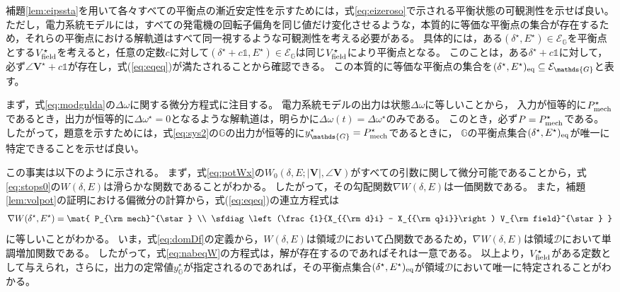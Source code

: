 \documentclass[tombow,dvipdfmx]{corona-a5}
\begin{document}
\begin{証明}
補題\ref{lem:eipssta}を用いて各々すべての平衡点の漸近安定性を示すためには，式\ref{eq:eizeroso}で示される平衡状態の可観測性を示せば良い。
ただし，電力系統モデルには，すべての発電機の回転子偏角を同じ値だけ変化させるような，本質的に等価な平衡点の集合が存在するため，それらの平衡点における解軌道はすべて同一視するような可観測性を考える必要がある。
具体的には，ある$(\delta^{\star},E^{\star}) \in \mathcal{E}_{\mathds{G}}$を平衡点とする$V_{\rm field}^{\star}$を考えると，任意の定数$c$に対して$(\delta^{\star}+c \mathds{1},E^{\star}) \in \mathcal{E}_{\mathds{G}}$は同じ$V_{\rm field}^{\star}$により平衡点となる。
このことは，ある$\delta^{\star}+c \mathds{1}$に対して，必ず$\angle \bm{V}^{\star}+c \mathds{1}$が存在し，式(\ref{eq:eqeq})が満たされることから確認できる。
この本質的に等価な平衡点の集合を$(\delta^{\star} ,E^{\star})_{\rm eq} \subseteq \mathcal{E}_{\mathds{G}}$と表す。

まず，式\ref{eq:modgnlda}の$\Delta \omega$に関する微分方程式に注目する。
電力系統モデルの出力は状態$\Delta \omega$に等しいことから，
入力が恒等的に$P_{\rm mech}^{\star}$であるとき，出力が恒等的に$\Delta \omega^{\star}=0$となるような解軌道は，明らかに$\Delta \omega(t) = \Delta \omega^{\star}$のみである。
このとき，必ず$P = P_{\rm mech}^{\star}$である。
したがって，題意を示すためには，式\ref{eq:sys2}の$\mathds{G}$の出力が恒等的に$y_{\mathds{G}}^{\star} = P_{\rm mech}^{\star}$であるときに，
$\mathds{G}$の平衡点集合$(\delta^{\star} ,E^{\star})_{\rm eq}$が唯一に特定できることを示せば良い。

この事実は以下のように示される。
まず，式\ref{eq:potWx}の$W_0(\delta, E; |\bm{V}|, \angle \bm{V})$がすべての引数に関して微分可能であることから，式\ref{eq:stops0}の$W(\delta,E)$は滑らかな関数であることがわかる。
したがって，その勾配関数$\nabla W(\delta,E)$は一価関数である。
また，補題\ref{lem:volpot}の証明における偏微分の計算から，式(\ref{eq:eqeq})の連立方程式は
\begin{align}\label{eq:nabeqW}
\nabla W(\delta^{\star},E^{\star})
=
\mat{
P_{\rm mech}^{\star} \\
\sfdiag\left(\frac{1}{X_{{\rm d}i} - X_{{\rm q}i}}\right) V_{\rm field}^{\star}
}
\end{align}
に等しいことがわかる。
いま，式\ref{eq:domDf}の定義から，$W(\delta,E)$は領域$\mathcal{D}$において凸関数であるため，$\nabla W(\delta,E)$は領域$\mathcal{D}$において単調増加関数である\cite{rockafellar1970convex,boyd2004convex}。
したがって，式\ref{eq:nabeqW}の方程式は，解が存在するのであればそれは一意である。
以上より，$V_{\rm field}^{\star}$がある定数として与えられ，さらに，出力の定常値$y_{\mathds{G}}^{\star}$が指定されるのであれば，その平衡点集合$(\delta^{\star} ,E^{\star})_{\rm eq}$が領域$\mathcal{D}$において唯一に特定されることがわかる。


\end{証明}
\end{document}
